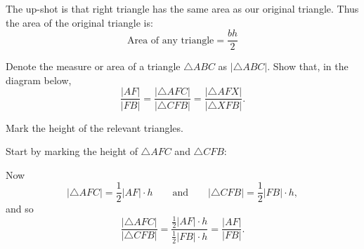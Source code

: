 \documentclass[newpage,hints,handout,nooutcomes,noauthor,12pt]{ximera}
\begin{document}
The up-shot is that right triangle has the same area as our original
triangle. Thus the area of the original triangle is:
    \[
    \text{Area of any triangle} = \frac{bh}{2}
    \]



  

\begin{problem}
\label{25} Denote the measure or area of a triangle $\triangle
ABC$ as $\left\vert \triangle ABC\right\vert $. Show that, in the
diagram below,
\[
\frac{\left\vert AF\right\vert }{\left\vert FB\right\vert }=\frac{\left\vert
\triangle AFC\right\vert }{\left\vert \triangle CFB\right\vert }%
=\frac{\left\vert \triangle AFX\right\vert }{\left\vert \triangle
XFB\right\vert }.
\]
\begin{image}
\end{image}
\begin{hint}
Mark the height of the relevant triangles.
\end{hint}
\begin{freeResponse}
Start by marking the height of $\triangle AFC$ and $\triangle CFB$:
\begin{image}
\end{image}
Now 
\[
|\triangle AFC| = \frac{1}{2} |AF|\cdot h\qquad\text{and}\qquad |\triangle CFB| = \frac{1}{2} |FB|\cdot h,
\]
and so
\[
\frac{|\triangle AFC|}{|\triangle CFB|} = \frac{\frac{1}{2} |AF|\cdot h}{\frac{1}{2} |FB|\cdot h} = \frac{|AF|}{|FB|}.
\]


\end{freeResponse}
\end{problem}
\end{document}
